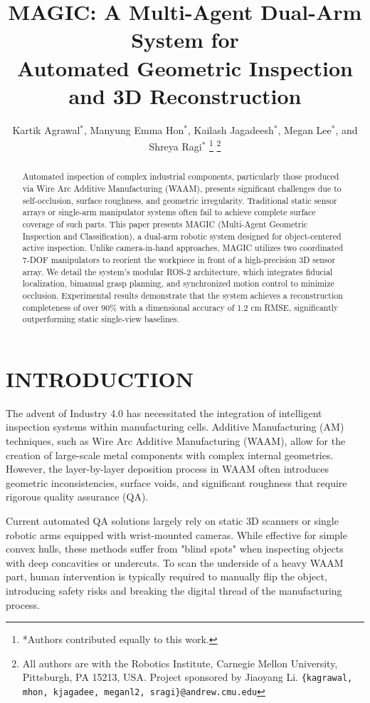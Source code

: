\documentclass[letterpaper, 10 pt, conference]{ieeeconf}  %
\title{\LARGE \bf
MAGIC: A Multi-Agent Dual-Arm System for \\ Automated Geometric Inspection and 3D Reconstruction
}
\author{Kartik Agrawal$^{*}$, Manyung Emma Hon$^{*}$, Kailash Jagadeesh$^{*}$, Megan Lee$^{*}$, and Shreya Ragi$^{*}$%
\thanks{*Authors contributed equally to this work.}%
\thanks{All authors are with the Robotics Institute, Carnegie Mellon University, Pittsburgh, PA 15213, USA. Project sponsored by Jiaoyang Li.
        {\tt\small \{kagrawal, mhon, kjagadee, meganl2, sragi\}@andrew.cmu.edu}}%
}
\begin{document}
\maketitle
\thispagestyle{empty}
\pagestyle{empty}


\begin{abstract}

Automated inspection of complex industrial components, particularly those produced via Wire Arc Additive Manufacturing (WAAM), presents significant challenges due to self-occlusion, surface roughness, and geometric irregularity. Traditional static sensor arrays or single-arm manipulator systems often fail to achieve complete surface coverage of such parts. This paper presents MAGIC (Multi-Agent Geometric Inspection and Classification), a dual-arm robotic system designed for object-centered active inspection. Unlike camera-in-hand approaches, MAGIC utilizes two coordinated 7-DOF manipulators to reorient the workpiece in front of a high-precision 3D sensor array. We detail the system's modular ROS-2 architecture, which integrates fiducial localization, bimanual grasp planning, and synchronized motion control to minimize occlusion. Experimental results demonstrate that the system achieves a reconstruction completeness of over 90\% with a dimensional accuracy of 1.2 cm RMSE, significantly outperforming static single-view baselines.

\end{abstract}


\section{INTRODUCTION}

The advent of Industry 4.0 has necessitated the integration of intelligent inspection systems within manufacturing cells. Additive Manufacturing (AM) techniques, such as Wire Arc Additive Manufacturing (WAAM), allow for the creation of large-scale metal components with complex internal geometries\cite{waam_overview}. However, the layer-by-layer deposition process in WAAM often introduces geometric inconsistencies, surface voids, and significant roughness that require rigorous quality assurance (QA).

Current automated QA solutions largely rely on static 3D scanners or single robotic arms equipped with wrist-mounted cameras. While effective for simple convex hulls, these methods suffer from "blind spots" when inspecting objects with deep concavities or undercuts. To scan the underside of a heavy WAAM part, human intervention is typically required to manually flip the object, introducing safety risks and breaking the digital thread of the manufacturing process.
\end{document}

